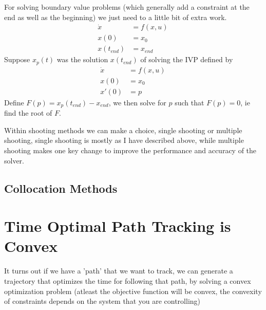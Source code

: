 \documentclass[a4paper, 10pt, twocolumn]{article}
\begin{document}
For solving boundary value problems (which generally add a constraint at the end as well as the beginning) we just need to a little bit of extra work.
\begin{align*}
    \dot{x}    & = f(x,u)\, \\
    x(0)       & = x_0      \\
    x(t_{end}) & = x_{end}
\end{align*}
Suppose \(x_p(t)\) was the solution \(x(t_{end})\) of solving the IVP defined by
\begin{align*}
    \dot{x} & = f(x,u)\, \\
    x(0)    & = x_0      \\
    x'(0)   & = p
\end{align*}
Define \(F(p) = x_p(t_{end}) - x_{end}\), we then solve for \(p\) such that \(F(p) = 0\), ie find the root of \(F\).

Within shooting methods we can make a choice, single shooting or multiple shooting, single shooting is mostly as I have described above, while multiple shooting makes one key change to improve the performance and accuracy of the solver.


\subsection{Collocation Methods}


\section{Time Optimal Path Tracking is Convex}

It turns out if we have a 'path' that we want to track, we can generate a trajectory that optimizes the time for following that path, by solving a convex optimization problem (atleast the objective function will be convex, the convexity of constraints depends on the system that you are controlling)
\end{document}
